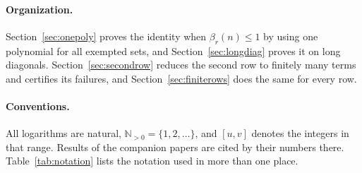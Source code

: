 \documentclass[11pt]{article}
\newcommand{\N}{\mathbb N}
\begin{document}
\paragraph{Organization.}
Section~\ref{sec:onepoly} proves the identity when $\beta_r(n)\le1$ by
using one polynomial for all exempted sets, and Section~\ref{sec:longdiag}
proves it on long diagonals.  Section~\ref{sec:secondrow} reduces the
second row to finitely many terms and certifies its failures, and
Section~\ref{sec:finiterows} does the same for every row.

\paragraph{Conventions.}
All logarithms are natural, $\N_{>0}=\{1,2,\ldots\}$, and $[u,v]$ denotes
the integers in that range.  Results of the companion papers are cited by
their numbers there.  Table~\ref{tab:notation} lists the notation used in
more than one place.
\end{document}
